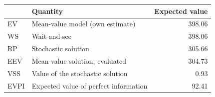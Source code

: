 \begin{tabular}{llr}
\toprule
 & Quantity & Expected value \\
\midrule
EV & Mean-value model (own estimate) & 398.06 \\
WS & Wait-and-see & 398.06 \\
RP & Stochastic solution & 305.66 \\
EEV & Mean-value solution, evaluated & 304.73 \\
VSS & Value of the stochastic solution & 0.93 \\
EVPI & Expected value of perfect information & 92.41 \\
\bottomrule
\end{tabular}
